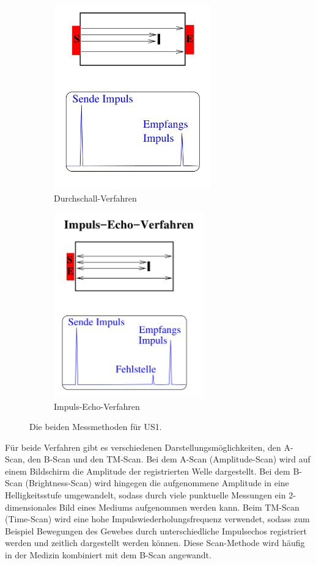 \begin{figure}
  \centering
  \begin{subfigure}{0.48\textwidth}
      \centering
      \includegraphics[height=8cm]{Pics/Durchschall.png}
      \caption{Durchschall-Verfahren}
      \label{fig:Durchschall}
  \end{subfigure}
  \begin{subfigure}{0.48\textwidth}
    \centering
      \includegraphics[height=8cm]{Pics/Impuls_Echo.png}
      \caption{Impuls-Echo-Verfahren}
      \label{fig:Impuls_Echo}
    \end{subfigure}
\caption{Die beiden Messmethoden für US1. \cite{anleitung01}}
\label{fig:Messmethoden}
\end{figure}

Für beide Verfahren gibt es verschiedenen Darstellungsmöglichkeiten, den A-Scan,
den B-Scan und den TM-Scan. Bei dem A-Scan (Amplitude-Scan) wird auf einem
Bildschirm die Amplitude der registrierten Welle dargestellt. Bei dem B-Scan
(Brightness-Scan) wird hingegen die aufgenommene Amplitude in eine Helligkeitsstufe
umgewandelt, sodass durch viele punktuelle Messungen ein 2-dimensionales Bild
eines Mediums aufgenommen werden kann. Beim TM-Scan (Time-Scan) wird eine hohe
Impulswiederholungsfrequenz verwendet, sodass zum Beispiel Bewegungen des Gewebes
durch unterschiedliche Impulsechos registriert werden und zeitlich dargestellt
werden können. Diese Scan-Methode wird häufig in der Medizin kombiniert mit dem
B-Scan angewandt.

